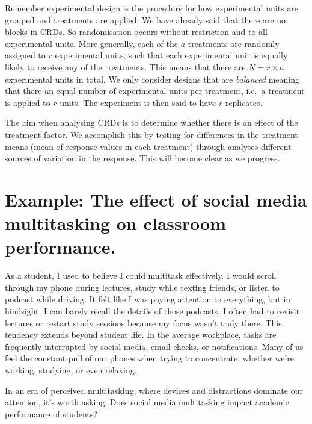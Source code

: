 \documentclass[
  letterpaper,
]{book}
\begin{document}
Remember experimental design is the procedure for how experimental units
are grouped and treatments are applied. We have already said that there
are no blocks in CRDs. So randomisation occurs without restriction and
to all experimental units. More generally, each of the \(a\) treatments
are randomly assigned to \(r\) experimental units, such that each
experimental unit is equally likely to receive any of the treatments.
This means that there are \(N = r \times a\) experimental units in
total. We only consider designs that are \emph{balanced} meaning that
there an equal number of experimental units per treatment, i.e.~a
treatment is applied to \(r\) units. The experiment is then said to have
\(r\) replicates.

The aim when analysing CRDs is to determine whether there is an effect
of the treatment factor. We accomplish this by testing for differences
in the treatment means (mean of response values in each treatment)
through analyses different sources of variation in the response. This
will become clear as we progress.

\section{Example: The effect of social media multitasking on classroom
performance.}\label{example-the-effect-of-social-media-multitasking-on-classroom-performance.}

As a student, I used to believe I could multitask effectively. I would
scroll through my phone during lectures, study while texting friends, or
listen to podcast while driving. It felt like I was paying attention to
everything, but in hindsight, I can barely recall the details of those
podcasts. I often had to revisit lectures or restart study sessions
because my focus wasn't truly there. This tendency extends beyond
student life. In the average workplace, tasks are frequently interrupted
by social media, email checks, or notifications. Many of us feel the
constant pull of our phones when trying to concentrate, whether we're
working, studying, or even relaxing.

In an era of perceived multitasking, where devices and distractions
dominate our attention, it's worth asking: Does social media
multitasking impact academic performance of students?
\end{document}
